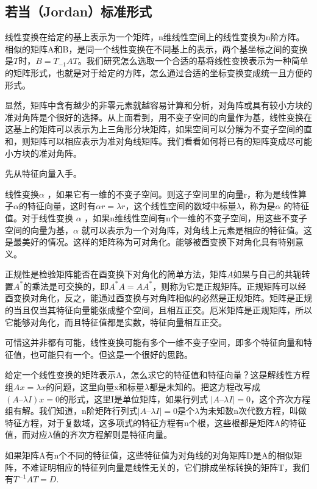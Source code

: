 	\subsection{若当（Jordan）标准形式}
	
	线性变换在给定的基上表示为一个矩阵，n维线性空间上的线性变换为n阶方阵。相似的矩阵A和B，是同一个线性变换在不同基上的表示，两个基坐标之间的变换是$ T $时，$ B= T_{-1}AT $。我们研究怎么选取一个合适的基将线性变换表示为一种简单的矩阵形式，也就是对于给定的方阵，怎么通过合适的坐标变换变成统一且方便的形式。
	
	显然，矩阵中含有越少的非零元素就越容易计算和分析，对角阵或具有较小方块的准对角阵是个很好的选择。从上面看到，用不变子空间的向量作为基，线性变换在这基上的矩阵可以表示为上三角形分块矩阵，如果空间可以分解为不变子空间的直和，则矩阵可以相应表示为准对角线矩阵。我们看看如何将已有的矩阵变成尽可能小方块的准对角阵。
	
	先从特征向量入手。
	
	线性变换$ \alpha $ ，如果它有一维的不变子空间。则这子空间里的向量r，称为是线性算子$ \alpha $的特征向量，这时有$  \alpha r  = \lambda r  $，这个线性空间的数域中标量$ \lambda $，称为是$ \alpha $ 的特征值。对于线性变换 $ \alpha $ ，如果n维线性空间有n个一维的不变子空间，用这些不变子空间的向量为基，$ \alpha $ 就可以表示为一个对角阵，对角线上元素是相应的特征值。这是最美好的情况。这样的矩阵称为可对角化。能够被酉变换下对角化具有特别意义。
	
	正规性是检验矩阵能否在酉变换下对角化的简单方法，矩阵$ A $如果与自己的共轭转置$ A^{*} $的乘法是可交换的，即$ A^*A  = AA^* $，则称为它是正规矩阵。正规矩阵可以经酉变换对角化，反之，能通过酉变换与对角阵相似的必然是正规矩阵。矩阵是正规的当且仅当其特征向量能张成整个空间，且相互正交。厄米矩阵是正规矩阵，所以它能够对角化，而且特征值都是实数，特征向量相互正交。
	
	可惜这并非都有可能，线性变换可能有多个一维不变子空间，即多个特征向量和特征值，也可能只有一个。但这是一个很好的思路。
	
	给定一个线性变换的矩阵表示A，怎么求它的特征值和特征向量？这是解线性方程组$ Ax=\lambda x $的问题，这里向量x和标量$ \lambda $都是未知的。把这方程改写成 $ (A – \lambda I)x = 0 $的形式，这里I是单位矩阵，如果行列式 $ |A – \lambda I| = 0 $，这个齐次方程组有解。我们知道，n阶矩阵行列式$  |A – \lambda I| = 0 $是个$ \lambda $为未知数n次代数方程，叫做特征方程，对于复数域，这多项式的特征方程有n个根，这些根都是矩阵A的特征值，而对应$ \lambda $值的齐次方程解则是特征向量。

	如果矩阵A有n个不同的特征值，这些特征值为对角线的对角矩阵D是A的相似矩阵，不难证明相应的特征列向量是线性无关的，它们排成坐标转换的矩阵T，我们有$ T^{-1}AT = D $.

